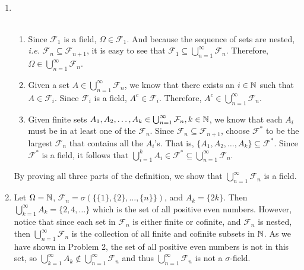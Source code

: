 \documentclass[12pt]{article}
\begin{document}
\begin{problem}[3]
~\begin{enumerate}[label=\alph*)]
	\item \\
	~\begin{enumerate}[label=\arabic*)]
		\item Since $\mathcal{F}_1$ is a field, $\Omega \in \mathcal{F}_1$. And because the sequence of sets are nested, \emph{i.e.} $\mathcal{F}_n \subseteq \mathcal{F}_{n+1}$, it is easy to see that $\mathcal{F}_1 \subseteq \bigcup_{n =1}^{\infty} \mathcal{F}_n$. Therefore, $\Omega \in \bigcup_{n =1}^{\infty} \mathcal{F}_n$.
		\item Given a set $A \in \bigcup_{n =1}^{\infty} \mathcal{F}_n$, we know that there exists an $i \in \mathbb{N}$ such that $A \in \mathcal{F}_i$. Since $\mathcal{F}_i$ is a field, $A^{c} \in \mathcal{F}_i$. Therefore, $A^{c} \in \bigcup_{n =1}^{\infty} \mathcal{F}_n$.
		\item Given finite sets $A_1,A_2,\ldots,A_k \in \bigcup_{n =1}^{\infty} \mathcal{F}_n, k \in \mathbb{N}$, we know that each $A_i$ must be in at least one of the $\mathcal{F}_n$. Since $\mathcal{F}_n \subseteq \mathcal{F}_{n+1}$, choose $\mathcal{F}^* $ to be the largest $\mathcal{F}_n$ that contains all the  $A_i$'s. That is, $\{A_1,A_2,\ldots,A_k\} \subseteq \mathcal{F}^* $. Since $\mathcal{F}^* $ is a field, it follows that $\bigcup_{i= 1}^{k} A_i \in \mathcal{F}^* \subseteq \bigcup_{n =1}^{\infty} \mathcal{F}_n$.
	\end{enumerate}
	By proving all three parts of the definition, we show that $\bigcup_{n =1}^{\infty} \mathcal{F}_n$ is a field.
\item Let $\Omega=\mathbb{N}$, $\mathcal{F}_n = \sigma(\{\{1\},\{2\},\ldots,\{n\}\})$, and $A_k = \{2k\} $. Then $\bigcup_{k=1}^{\infty} A_k = \{2,4,\ldots\} $ which is the set of all positive even numbers. However, notice that since each set in $\mathcal{F}_n$ is either finite or cofinite, and $\mathcal{F}_n$ is nested, then $\bigcup_{n =1}^{\infty} \mathcal{F}_n$ is the collection of all finite and cofinite subsets in $\mathbb{N}$. As we have shown in Problem 2, the set of all positive even numbers is not in this set, so $\bigcup_{k=1}^{\infty} A_k \not \in \bigcup_{n=1}^{\infty} \mathcal{F}_n$ and thus $\bigcup_{n =1}^{\infty} \mathcal{F}_n$ is not a $\sigma$-field.
\end{enumerate} 
\end{problem}
\end{document}

